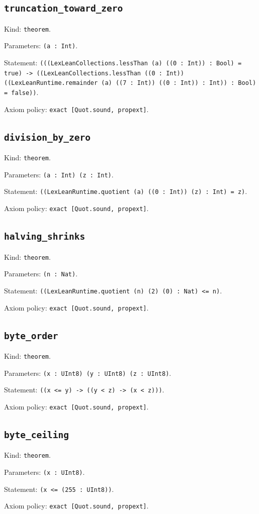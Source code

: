\documentclass[11pt]{article}
\begin{document}
\subsection*{\texttt{truncation\_toward\_zero}}
\noindent Kind: \texttt{theorem}.\par
\noindent Parameters: \texttt{(a : Int)}.\par
\noindent Statement: \texttt{(((LexLeanCollections.lessThan (a) ((0 : Int)) : Bool) = true) -> ((LexLeanCollections.lessThan ((0 : Int)) ((LexLeanRuntime.remainder (a) ((7 : Int)) ((0 : Int)) : Int)) : Bool) = false))}.\par
\noindent Axiom policy: \texttt{exact [Quot.sound, propext]}.\par
\subsection*{\texttt{division\_by\_zero}}
\noindent Kind: \texttt{theorem}.\par
\noindent Parameters: \texttt{(a : Int) (z : Int)}.\par
\noindent Statement: \texttt{((LexLeanRuntime.quotient (a) ((0 : Int)) (z) : Int) = z)}.\par
\noindent Axiom policy: \texttt{exact [Quot.sound, propext]}.\par
\subsection*{\texttt{halving\_shrinks}}
\noindent Kind: \texttt{theorem}.\par
\noindent Parameters: \texttt{(n : Nat)}.\par
\noindent Statement: \texttt{((LexLeanRuntime.quotient (n) (2) (0) : Nat) <= n)}.\par
\noindent Axiom policy: \texttt{exact [Quot.sound, propext]}.\par
\subsection*{\texttt{byte\_order}}
\noindent Kind: \texttt{theorem}.\par
\noindent Parameters: \texttt{(x : UInt8) (y : UInt8) (z : UInt8)}.\par
\noindent Statement: \texttt{((x <= y) -> ((y < z) -> (x < z)))}.\par
\noindent Axiom policy: \texttt{exact [Quot.sound, propext]}.\par
\subsection*{\texttt{byte\_ceiling}}
\noindent Kind: \texttt{theorem}.\par
\noindent Parameters: \texttt{(x : UInt8)}.\par
\noindent Statement: \texttt{(x <= (255 : UInt8))}.\par
\noindent Axiom policy: \texttt{exact [Quot.sound, propext]}.\par
\end{document}
